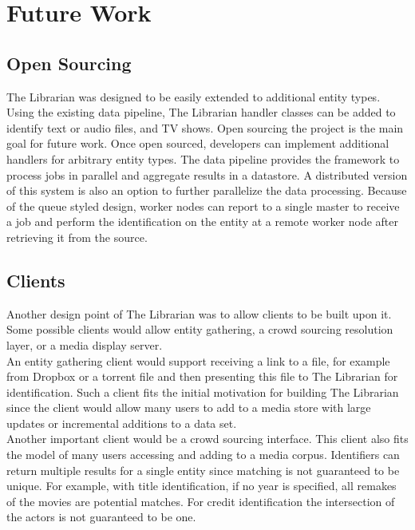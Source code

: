 \documentclass[paper=a4, fontsize=11pt]{scrartcl} %
\numberwithin{equation}{section} %
\numberwithin{figure}{section} %
\numberwithin{table}{section} %
\begin{document}

\section{Future Work}
\label{sec:future-work}

\subsection{Open Sourcing}
\label{sec:open-sourcing}
The Librarian was designed to be easily extended to additional entity types. Using the existing data pipeline, The Librarian handler classes can be added to identify text or audio files, and TV shows. Open sourcing the project is the main goal for future work. Once open sourced, developers can implement additional handlers for arbitrary entity types. The data pipeline provides the framework to process jobs in parallel and aggregate results in a datastore. A distributed version of this system is also an option to further parallelize the data processing. Because of the queue styled design, worker nodes can report to a single master to receive a job and perform the identification on the entity at a remote worker node after retrieving it from the source. \\

\subsection{Clients}
\label{sec:clients}
Another design point of The Librarian was to allow clients to be built upon it. Some possible clients would allow entity gathering, a crowd sourcing resolution layer, or a media display server. \\

An entity gathering client would support receiving a link to a file, for example from Dropbox or a torrent file and then presenting this file to The Librarian for identification. Such a client fits the initial motivation for building The Librarian since the client would allow many users to add to a media store with large updates or incremental additions to a data set. \\

Another important client would be a crowd sourcing interface. This client also fits the model of many users accessing and adding to a media corpus. Identifiers can return multiple results for a single entity since matching is not guaranteed to be unique. For example, with title identification, if no year is specified, all remakes of the movies are potential matches. For credit identification the intersection of the actors is not guaranteed to be one. \\
\end{document}
